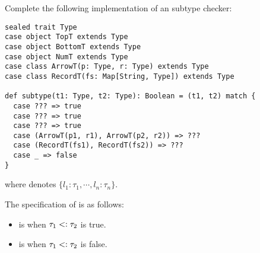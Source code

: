 \begin{exercise}

Complete the following implementation of an \Lang subtype checker:

\begin{verbatim}
sealed trait Type
case object TopT extends Type
case object BottomT extends Type
case object NumT extends Type
case class ArrowT(p: Type, r: Type) extends Type
case class RecordT(fs: Map[String, Type]) extends Type

def subtype(t1: Type, t2: Type): Boolean = (t1, t2) match {
  case ??? => true
  case ??? => true
  case ??? => true
  case (ArrowT(p1, r1), ArrowT(p2, r2)) => ???
  case (RecordT(fs1), RecordT(fs2)) => ???
  case _ => false
}
\end{verbatim}

where 
denotes $\{l_1:\tau_1,\cdots,l_n:\tau_n\}$.

The specification of  is as follows:
\begin{itemize}
  \item {} is  when $\tau_1<:\tau_2$
    is true.
  \item {} is  when $\tau_1<:\tau_2$
    is false.
\end{itemize}

\end{exercise}

